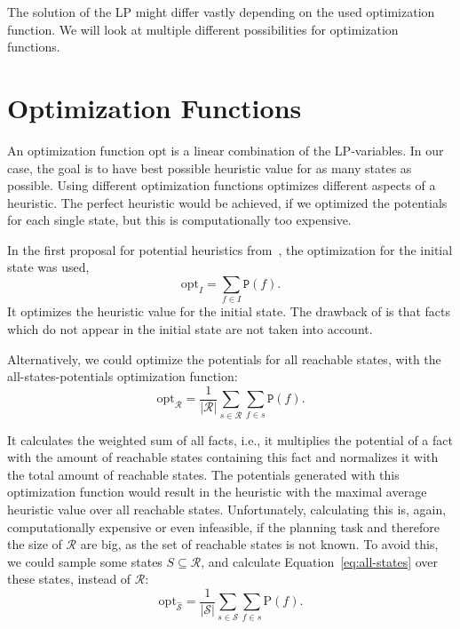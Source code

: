 The solution of the LP might differ vastly depending on the used optimization function.
We will look at multiple different possibilities for optimization functions.

\section{Optimization Functions}\label{sec:optimization}
An optimization function $\mathrm{opt}$ is a linear combination of the LP-variables.
In our case, the goal is to have best possible heuristic value for as many states as possible.
Using different optimization functions optimizes different aspects of a heuristic.
The perfect heuristic would be achieved, if we optimized the potentials for each single state, but this is computationally too expensive.

In the first proposal for potential heuristics from~\citeauthor{pommerening2015non}, the optimization for the initial state was used,
\begin{equation}\mathrm{opt}_I=\sum_{f\in I}\mathtt{P}(f).\label{eq:initial-state}\end{equation}
It optimizes the heuristic value for the initial state.
The drawback of is that facts which do not appear in the initial state are not taken into account.

Alternatively, we could optimize the potentials for all reachable states, with the all-states-potentials optimization function:
\begin{equation}\mathrm{opt}_\mathcal{R} = \frac{1}{|\mathcal{R}|}\sum_{s\in\mathcal{R}}\sum_{f\in s}\mathtt{P}(f).\label{eq:all-states}\end{equation}

It calculates the weighted sum of all facts, i.e., it multiplies the potential of a fact with the amount of reachable states containing this fact and normalizes it with the total amount of reachable states.
The potentials generated with this optimization function would result in the heuristic with the maximal average heuristic value over all reachable states.
Unfortunately, calculating this is, again, computationally expensive or even infeasible, if the planning task and therefore the size of $\mathcal{R}$ are big, as the set of reachable states is not known.
To avoid this, we could sample some states $S\subseteq\mathcal{R}$, and calculate Equation~\eqref{eq:all-states} over these states, instead of $\mathcal{R}$:
\begin{equation} \mathrm{opt}_\mathcal{\hat{S}}=\frac{1}{|\mathcal{S}|}\sum_{s\in\mathcal{S}}\sum_{f\in s} \mathrm{P}(f).\label{eq:uniform-opt}\end{equation}

